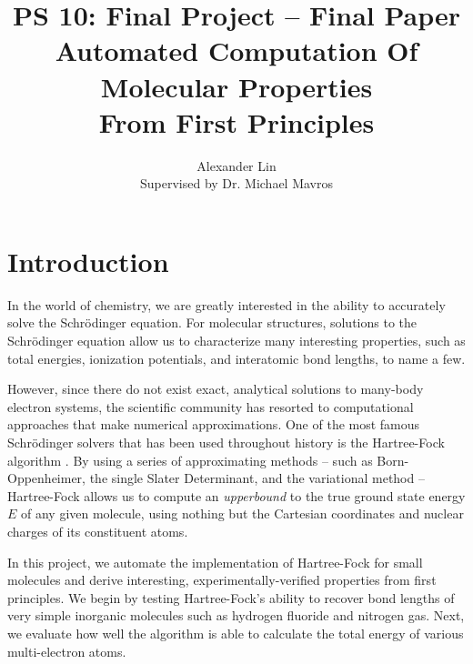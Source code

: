 \documentclass[12pt]{article}
\begin{document}
\title{{\Large PS 10: Final Project -- Final Paper} \\ Automated Computation Of Molecular Properties \\ From First Principles}
\author{Alexander Lin \\ Supervised by Dr. Michael Mavros}

\maketitle

\section{Introduction}

In the world of chemistry, we are greatly interested in the ability to accurately solve the Schr\"odinger equation.  For molecular structures, solutions to the Schr\"odinger equation allow us to characterize many interesting properties, such as total energies, ionization potentials, and interatomic bond lengths, to name a few. 

However, since there do not exist exact, analytical solutions to many-body electron systems, the scientific community has resorted to computational approaches that make numerical approximations.  One of the most famous Schr\"odinger solvers that has been used throughout history is the Hartree-Fock algorithm \cite{szabo2012}.  By using a series of approximating methods -- such as Born-Oppenheimer, the single Slater Determinant, and the variational method -- Hartree-Fock allows us to compute an \emph{upperbound} to the true ground state energy $E$ of any given molecule, using nothing but the Cartesian coordinates and nuclear charges of its constituent atoms.   

In this project, we automate the implementation of Hartree-Fock for small molecules and derive interesting, experimentally-verified properties from first principles.  We begin by testing Hartree-Fock's ability to recover bond lengths of very simple inorganic molecules such as hydrogen fluoride and nitrogen gas.  Next, we evaluate how well the algorithm is able to calculate the total energy of various multi-electron atoms.  
\end{document}
